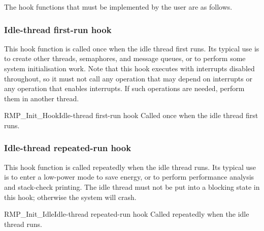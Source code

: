 The hook functions that must be implemented by the user are as follows.

\subsubsection{Idle-thread first-run hook}

This hook function is called once when the idle thread first runs.
Its typical use is to create other threads, semaphores, and message queues, or to perform some system initialisation work.
Note that this hook executes with interrupts disabled throughout, so it must not call any operation that may depend on interrupts or any operation that enables interrupts.
If such operations are needed, perform them in another thread.

\begin{apidesc}{RMP\_Init\_Hook}{Idle-thread first-run hook}\label{api:RMP_Init_Hook}
    Called once when the idle thread first runs.
    \begin{apiparams}
    \end{apiparams}
    \begin{apiret}
    \end{apiret}
\end{apidesc}

\subsubsection{Idle-thread repeated-run hook}

This hook function is called repeatedly when the idle thread runs.
Its typical use is to enter a low-power mode to save energy, or to perform performance analysis and stack-check printing.
The idle thread must not be put into a blocking state in this hook; otherwise the system will crash.

\begin{apidesc}{RMP\_Init\_Idle}{Idle-thread repeated-run hook}\label{api:RMP_Init_Idle}
    Called repeatedly when the idle thread runs.
    \begin{apiparams}
    \end{apiparams}
    \begin{apiret}
    \end{apiret}
\end{apidesc}

